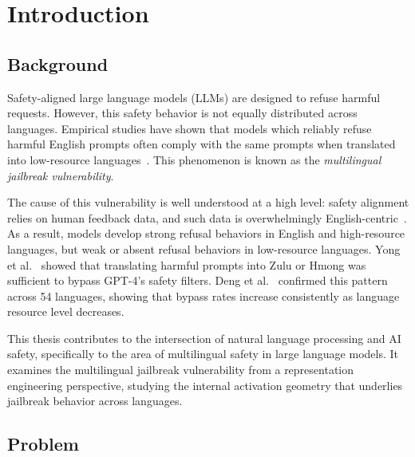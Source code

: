 \chapter{Introduction}
\label{chap:introduction}

\section{Background}
\label{sec:background}

Safety-aligned large language models (LLMs) are designed to refuse harmful requests. However, this safety behavior is not equally distributed across languages. Empirical studies have shown that models which reliably refuse harmful English prompts often comply with the same prompts when translated into low-resource languages~\citep{yong2023low, deng2024multilingual}. This phenomenon is known as the \textit{multilingual jailbreak vulnerability}.

The cause of this vulnerability is well understood at a high level: safety alignment relies on human feedback data, and such data is overwhelmingly English-centric~\citep{ouyang2022training, krasnodkebska2026safety}. As a result, models develop strong refusal behaviors in English and high-resource languages, but weak or absent refusal behaviors in low-resource languages. Yong et al.~\citeyearpar{yong2023low} showed that translating harmful prompts into Zulu or Hmong was sufficient to bypass GPT-4's safety filters. Deng et al.~\citeyearpar{deng2024multilingual} confirmed this pattern across 54 languages, showing that bypass rates increase consistently as language resource level decreases.

This thesis contributes to the intersection of natural language processing and AI safety, specifically to the area of multilingual safety in large language models. It examines the multilingual jailbreak vulnerability from a representation engineering perspective, studying the internal activation geometry that underlies jailbreak behavior across languages.

\section{Problem}
\label{sec:problem}

